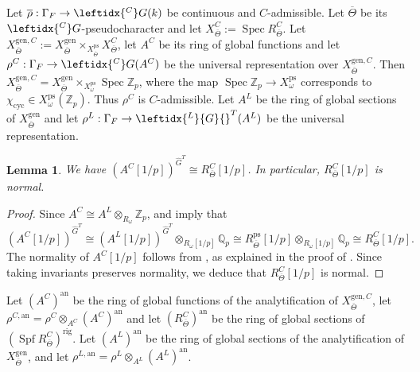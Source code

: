 \documentclass{amsart}
\newtheorem{lem}[prop]{Lemma}
\theoremstyle{definition}
\theoremstyle{remark}
\DeclareMathOperator{\Spec}{Spec}
\newcommand{\Qp}{\mathbb {Q}_p}
\newcommand{\Zp}{\ZZ_p}
\newcommand{\ZZ}{\mathbb Z}
\newcommand{\ana}{\mathrm{an}}
\newcommand{\rhobar}{\overline{\rho}}
\newcommand{\gen}{\mathrm{gen}}
\DeclareMathOperator{\Spf}{Spf}
\newcommand{\rig}{\mathrm{rig}}
\newcommand{\cyc}{\mathrm{cyc}}
\newcommand{\Thetabar}{\overline{\Theta}}
\newcommand{\ps}{\mathrm{ps}}
\newcommand{\Ghat}{\widehat{G}}
\newcommand{\LG}{\leftidx{^L}{G}{}}
\newcommand{\CG}{\leftidx{^C}G{}}
\begin{document}
Let $\rhobar: \Gamma_F \rightarrow \CG(k)$ be continuous and $C$-admissible. Let $\Thetabar$ be its $\CG$-pseudocharacter and let $X^{C}_{\Thetabar}:=\Spec R^C_{\Thetabar}$. Let $X^{\gen, C}_{\Thetabar}:= 
X^{\gen}_{\Thetabar}\times_{X^{\ps}_{\Thetabar}} X^{C}_{\Thetabar}$, let $A^C$ be its ring of global functions  and let $\rho^C: \Gamma_F \rightarrow \CG(A^C)$ be the universal representation over $X^{\gen, C}_{\Thetabar}$. Then $X^{\gen, C}_{\Thetabar} = X^{\gen}_{\Thetabar}\times_{X^{\ps}_{\omega}} \Spec \Zp$, where the map $\Spec \Zp\rightarrow X^{\ps}_{\omega}$ corresponds to $\chi_{\cyc}\in X^{\ps}_{\omega}(\Zp)$. Thus $\rho^C$ is $C$-admissible. Let $A^L$ be the ring of global sections of $X^{\gen}_{\Thetabar}$ and let $\rho^L: \Gamma_F \rightarrow \LG^T(A^L)$ be the universal representation.

\begin{lem}\label{normal_C} We have $(A^C[1/p])^{\Ghat^T}\cong R^C_{\Thetabar}[1/p]$. In particular, $R^C_{\Thetabar}[1/p]$ is normal. 
\end{lem}
\begin{proof} Since $A^C\cong A^L\otimes_{R_{\omega}}\Zp$,  and  imply that 
$$(A^C[1/p])^{\Ghat^T}\cong (A^L[1/p])^{\Ghat^T}\otimes_{R_{\omega}[1/p]} \Qp\cong 
R^{\ps}_{\Thetabar}[1/p]\otimes_{R_{\omega}[1/p]} \Qp
\cong R^C_{\Thetabar}[1/p].$$
The normality of $A^C[1/p]$ follows from 
\cite[Theorem 15.19]{defG},
as explained in the proof of \cite[Theorem 16.5]{defG}.
Since taking invariants preserves normality, we deduce that $R^{C}_{\Thetabar}[1/p]$ is normal. 
\end{proof} 


Let $(A^C)^{\ana}$ be the ring of global functions of the analytification of $X^{\gen, C}_{\Thetabar}$, let $\rho^{C,\ana}= \rho^C\otimes_{A^C} (A^C)^{\ana}$ and let $(R^C_{\Thetabar})^{\ana}$ be the ring of global sections of $(\Spf R^C_{\Thetabar})^{\rig}$. 
Let  $(A^L)^{\ana}$ be the ring of global sections of the analytification of $X^{\gen}_{\Thetabar}$, and let
$\rho^{L,\ana}=\rho^L\otimes_{A^L} (A^L)^{\ana}$.
\end{document}
